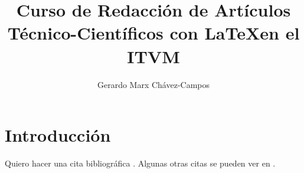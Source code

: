 \documentclass{IEEEtran}
\title{Curso de Redacción de Artículos Técnico-Científicos con \LaTeX en el ITVM}
\author{Gerardo Marx Chávez-Campos}
\begin{document}
\maketitle
\section{Introducción}
\blindtext[1]

Quiero hacer una cita bibliográfica \cite{romanya2007analisis}. Algunas otras
citas se pueden ver en \cite[pag.25]{alvarez2019influencia, verdenelli2019proteinas}.


\end{document}
